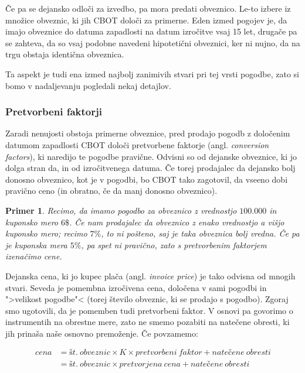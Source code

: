\documentclass[a4paper]{article}
\newtheorem{primer}{Primer}
\begin{document}
Če pa se dejansko odloči za izvedbo, pa mora predati obveznico. Le-to izbere iz množice obveznic, ki jih
CBOT določi za primerne. Eden izmed pogojev je, da imajo obveznice do datuma zapadlosti na datum izročitve
vsaj 15 let, drugače pa se zahteva, da so vsaj podobne navedeni hipotetični obveznici, ker ni nujno, da na
trgu obstaja identična obveznica. 

Ta aspekt je tudi ena izmed najbolj zanimivih stvari pri tej vrsti pogodbe, zato si bomo v nadaljevanju 
pogledali nekaj detajlov.


\subsubsection{Pretvorbeni faktorji}
Zaradi nenujosti obstoja primerne obveznice, pred prodajo pogodb z določenim datumom zapadlosti CBOT 
določi pretvorbene faktorje (angl. \textit{conversion factors}), ki naredijo te pogodbe pravične. 
Odvisni so od dejanske obveznice, ki jo dolga stran da, in od izročitvenega datuma. Če torej prodajalec
da dejansko bolj donosno obveznico, kot je v pogodbi, bo CBOT tako zagotovil, da vseeno dobi pravično
ceno (in obratno, če da manj donosno obveznico).

\begin{primer}
    Recimo, da imamo pogodbo za obveznico z vrednostjo \textdollar$100.000$ in kuponsko mero $6\$$. 
    Če nam prodajalec da obveznico z enako vrednostjo a višjo kuponsko mero; recimo $7\%$, to ni 
    pošteno, saj je taka obveznica bolj vredna. Če pa je kuponska mera $5\%$, pa spet ni pravično, 
    zato s pretvorbenim faktorjem izenačimo cene.
\end{primer}

Dejanska cena, ki jo kupec plača (angl. \textit{invoice price}) je tako odvisna od mnogih stvari. 
Seveda je pomembna izročivena cena, določena v sami pogodbi in ">velikost pogodbe"< (torej število
obveznic, ki se prodajo s pogodbo). Zgoraj smo ugotovili, da je pomemben tudi pretvorbeni faktor. 
V osnovi pa govorimo o instrumentih na obrestne mere, zato ne smemo pozabiti na natečene obresti, 
ki jih prinaša naše osnovno premoženje. Če povzamemo:

\begin{align*}
    cena 
    &= št.\:obveznic \times K \times pretvorbeni\:faktor + natečene\:obresti \\
    &= št.\:obveznic \times pretvorjena\:cena + natečene\:obresti
\end{align*}
\end{document}
